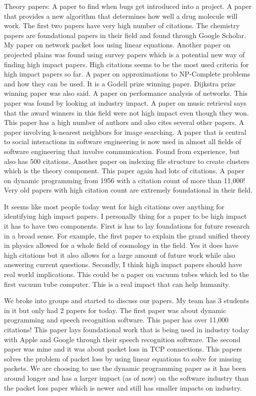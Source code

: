 \documentclass[conference]{IEEEtran}
\begin{document}
Theory papers: A paper to find when bugs get introduced into a project.
A paper that provides a new algorithm that determines how well a drug molecule will work. The
first two papers have very high number of citations. The chemistry papers are foundational 
papers in their field and found through Google Scholar. My paper on network packet loss using
linear equations. Another paper on projected plains was found using survey papers which is 
a potential new way of finding high impact papers. High citations seems to be the most used
criteria for high impact papers so far. A paper on approximations to NP-Complete problems and
how they can be used. It is a Godell prize winning paper. Dijkstra prize winning paper was 
also said. A paper on performance analysis of networks. This paper was found by looking at
industry impact. A paper on music retrieval says that the award winners in this field were not
high impact even though they won. This paper has a high number of authors and also cites several
other papers. A paper involving k-nearest neighbors for image searching. A paper that is
central to social interactions in software engineering is now used in almost all fields of
software engineering that involve communication. Found from experience, but also has 500
citations. Another paper on indexing file structure to create clusters which is the theory 
component. This paper again had lots of citations. A paper on dynamic programming from 1956 with
a citation count of more than 11,000! Very old papers with high citation count are extremely
foundational in their field.

It seems like most people today went for high citations over anything for identifying
high impact papers. I personally thing for a paper to be high impact it has to have
two components. First is has to lay foundations for future research in a broad sense.
For example, the first paper to explain the grand unified theory in physics allowed for
a whole field of cosmology in the field. Yes it does have high citations but it
also allows for a large amount of future work while also answering current questions.
Secondly, I think high impact papers should have real world implications. This could
be a paper on vacuum tubes which led to the first vacuum tube computer. This is a real impact
that can help humanity.

We broke into groups and started to discuss our papers. My team has 3 students in it 
but only had 2 papers for today. The first paper was about dynamic programming and speech
recognition software. This paper has over 11,000 citations! This paper lays foundational
work that is being used in industry today with Apple and Google through their speech
recognition software. The second paper was mine and it was about packet loss in TCP 
connections. This papers solves the problem of packet loss by using linear equations
to solve for missing packets. We are choosing to use the dynamic programming paper
as it has been around longer and has a larger impact (as of now) on the software
industry than the packet loss paper which is newer and still has smaller impacts
on industry.
\end{document}

